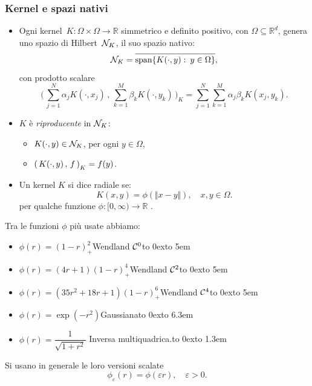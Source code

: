 \documentclass[10pt]{beamer}
\theoremstyle{definition}
\theoremstyle{plain}
\def\R{\mathbb R}
\def\Cal#1{{\cal #1}}
\def\form#1#2{(\,#1\,,\,#2\,)}
\def\Bform#1#2{\biggl(\,#1\,,\,#2\,\biggr)}
\def\norm#1{\Vert #1\Vert}
\def\hbyw#1#2{\vbox to #1{\vfil \hbox to #2{\hfil}}}
\def\lK{{\lower.5ex\hbox{$\scriptstyle K$}}}
\begin{document}
\begin{frame}
\frametitle{Kernel e spazi nativi}
\begin{itemize}
\item
Ogni \alert{kernel}~$K:\Omega\times\Omega\to\R$ simmetrico e definito positivo, con $\Omega\subseteq\R^d$, genera uno spazio di Hilbert~$\Cal N_K$, il suo \alert{spazio nativo}:
$$
\Cal N_K = \overline{\operatorname{span}\{K(\cdot, y):\> y\in\Omega\}\hbyw{2ex}{0em}},
$$
con prodotto scalare
$$
\Bform{\sum_{j=1}^N\alpha_jK(\cdot, x_j)}{\sum_{k=1}^M\beta_k K(\cdot,y_k)}_{\!\!K} =  \sum_{j=1}^N\sum_{k=1}^M \alpha_j \beta_k K(x_j,y_k).
$$


\item
$K$ è \emph{riproducente} in $\Cal N_K$:
\begin{itemize}
\item $K(\cdot, y) \in\Cal N_K$, \quad per ogni $y\in\Omega$,
\item  $\form{K(\cdot, y)}f_{\lK} = f(y)$.
\end{itemize}

\medskip\item
Un kernel $K$ si dice \alert{radiale} se:
$$
K(x, y) = \phi(\norm{x - y}), \quad x,y\in\Omega.
$$
per qualche funzione  $\phi:[0,\infty)\to\R$ .
\end{itemize}
\end{frame}


\begin{frame}

Tra le funzioni $\phi$ più usate abbiamo:
\begin{itemize}
\item $\phi(r) =  (1- r)_+^2$\hfill Wendland $\Cal C^0$\hbyw{0ex}{5em}
\item $\phi(r) = (4r+1)(1- r)^4_+$\hfill Wendland $\Cal C^2$\hbyw{0ex}{5em}
\item $\phi(r) = (35r^2 +18r+1)(1- r)^6_+$\hfill Wendland $\Cal C^4$\hbyw{0ex}{5em}

\bigskip

\item $\phi(r) = \exp(-r^2)$\hfill Gaussiana\hbyw{0ex}{6.3em}
\item $\phi(r) = \dfrac1{\sqrt{1+r^2}}$ \hfill Inversa multiquadrica.\hbyw{0ex}{1.3em}
\end{itemize}

\bigskip

Si usano in generale le loro versioni scalate
$$
\phi_\varepsilon(r) = \phi(\varepsilon r), \quad \varepsilon>0.
$$

\end{frame}
\end{document}
